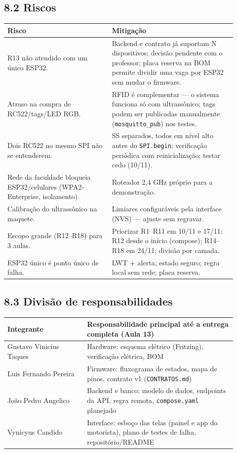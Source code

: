 \documentclass[11pt,a4paper]{article}
\newcommand{\cod}[1]{\texttt{#1}}
\begin{document}
\subsection*{8.2 Riscos}

\begin{longtable}{|p{0.42\linewidth}|p{0.50\linewidth}|}
\hline
\textbf{Risco} & \textbf{Mitigação} \\ \hline \endhead
R13 não atendido com um único ESP32. & Backend e contrato já suportam N dispositivos; decisão pendente com o professor; placa reserva na BOM permite dividir uma vaga por ESP32 sem mudar o firmware. \\ \hline
Atraso na compra de RC522/tags/LED RGB. & RFID é complementar --- o sistema funciona só com ultrassônico; tags podem ser publicadas manualmente (\cod{mosquitto\_pub}) nos testes. \\ \hline
Dois RC522 no mesmo SPI não se entenderem. & SS separados, todos em nível alto antes do \cod{SPI.begin}; verificação periódica com reinicialização; testar cedo (10/11). \\ \hline
Rede da faculdade bloqueia ESP32/celulares (WPA2-Enterprise, isolamento). & Roteador 2,4 GHz próprio para a demonstração. \\ \hline
Calibração do ultrassônico na maquete. & Limiares configuráveis pela interface (NVS) --- ajuste sem regravar. \\ \hline
Escopo grande (R12--R18) para 3 aulas. & Priorizar R1--R11 em 10/11 e 17/11; R12 desde o início (compose); R14--R18 em 24/11; divisão por camada. \\ \hline
ESP32 único é ponto único de falha. & LWT + alerta; estado seguro; regra local sem rede; placa reserva. \\ \hline
\end{longtable}

\subsection*{8.3 Divisão de responsabilidades}

\begin{longtable}{|p{0.32\linewidth}|p{0.60\linewidth}|}
\hline
\textbf{Integrante} & \textbf{Responsabilidade principal até a entrega completa (Aula 13)} \\ \hline \endhead
Gustavo Vinicius Taques & Hardware: esquema elétrico (Fritzing), verificação elétrica, BOM \\ \hline
Luis Fernando Pereira & Firmware: fluxograma de estados, mapa de pinos, contrato v1 (\cod{CONTRATOS.md}) \\ \hline
João Pedro Angelico & Backend e banco: modelo de dados, endpoints da API, regra remota, \cod{compose.yaml} planejado \\ \hline
Vynicyus Candido & Interface: esboço das telas (painel e app do motorista), plano de testes de falha, repositório/README \\ \hline
\end{longtable}
\end{document}
